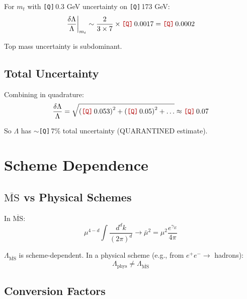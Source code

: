 \documentclass[11pt,a4paper]{article}
\newcommand{\Qnum}[1]{\textcolor{red!70!black}{\texttt{[Q]}}\,#1}
\theoremstyle{definition}
\begin{document}
For $m_t$ with \Qnum{0.3} GeV uncertainty on \Qnum{173} GeV:
\begin{equation}
\label{eq:dlambda-mt}
\frac{\delta\Lambda}{\Lambda}\bigg|_{m_t} \sim \frac{2}{3 \times 7} \times \Qnum{0.0017}
  = \Qnum{0.0002}
\end{equation}

Top mass uncertainty is subdominant.

\subsection{Total Uncertainty}
\label{subsec:total-uncert}

Combining in quadrature:
\begin{equation}
\label{eq:total-lambda-uncert}
\frac{\delta\Lambda}{\Lambda} = \sqrt{\left(\Qnum{0.053}\right)^2 + \left(\Qnum{0.05}\right)^2 + \ldots}
  \approx \Qnum{0.07}
\end{equation}

So $\Lambda$ has $\sim$\Qnum{7}\% total uncertainty (QUARANTINED estimate).

\section{Scheme Dependence}
\label{app:scheme-dep}

\subsection{$\overline{\text{MS}}$ vs Physical Schemes}
\label{subsec:msbar-vs-phys}

In $\overline{\text{MS}}$:
\begin{equation}
\label{eq:msbar-def-app}
\mu^{4-d}\int\frac{d^d k}{(2\pi)^d} \to \bar{\mu}^2 = \mu^2\frac{e^{\gamma_E}}{4\pi}
\end{equation}

$\Lambda_{\overline{\text{MS}}}$ is scheme-dependent. In a physical scheme (e.g., from $e^+e^- \to$ hadrons):
\begin{equation}
\label{eq:lambda-physical-scheme}
\Lambda_{\text{phys}} \neq \Lambda_{\overline{\text{MS}}}
\end{equation}

\subsection{Conversion Factors}
\label{subsec:conversion-factors}
\end{document}
